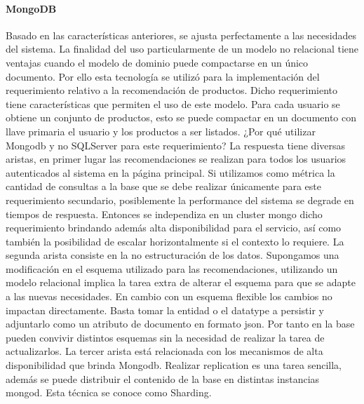 \documentclass[journal]{IEEEtran}
\begin{document}
\paragraph{MongoDB}
Basado en las características anteriores, se ajusta perfectamente a las necesidades del sistema. La finalidad del uso particularmente de un modelo no relacional tiene ventajas cuando el modelo de dominio puede compactarse en un único documento. Por ello esta tecnología se utilizó para la implementación del requerimiento relativo a la recomendación de productos.
Dicho requerimiento tiene características que permiten el uso de este modelo. Para cada usuario se obtiene un conjunto de productos, esto se puede compactar en un documento con llave primaria el usuario y los productos a ser listados.
¿Por qué utilizar Mongodb y no SQLServer para este requerimiento?
La respuesta tiene diversas aristas, en primer lugar las recomendaciones se realizan para todos los usuarios autenticados al sistema en la página principal. Si utilizamos como métrica la cantidad de consultas a la base que se debe realizar únicamente para este requerimiento secundario, posiblemente la performance del sistema se degrade en tiempos de respuesta. Entonces se independiza en un cluster mongo dicho requerimiento brindando además alta disponibilidad para el servicio, así como también la posibilidad de escalar horizontalmente si el contexto lo requiere.
La segunda arista consiste en la no estructuración de los datos. Supongamos una modificación en el esquema utilizado para las recomendaciones, utilizando un modelo relacional implica la tarea extra de alterar el esquema para que se adapte a las nuevas necesidades. En cambio con un esquema flexible los cambios no impactan directamente. Basta tomar la entidad o el datatype a persistir y adjuntarlo como un atributo de documento en formato json. Por tanto en la base pueden convivir distintos esquemas sin la necesidad de realizar la tarea de actualizarlos.
La tercer arista está relacionada con los mecanismos de alta disponibilidad que brinda Mongodb. Realizar replication es una tarea sencilla, además se puede distribuir el contenido de la base en distintas instancias mongod. Esta técnica se conoce como Sharding.
\end{document}
